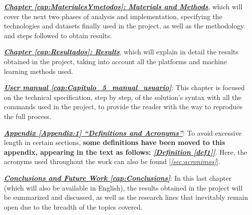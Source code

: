 \hyperref[cap:MaterialesYmetodos]{\textbf{\textit{Chapter \ref*{cap:MaterialesYmetodos}: Materials and Methods}}}, which will cover the next two phases of analysis and implementation, specifying the technologies and datasets finally used in the project, as well as the methodology and steps followed to obtain results.

\hyperref[cap:Resultados]{\textbf{\textit{Chapter \ref*{cap:Resultados}: Results}}}, which will explain in detail the results obtained in the project, taking into account all the platforms and machine learning methods used.

\hyperref[cap:Capitulo_5_manual_usuario]{\textbf{\textit{User manual \ref*{cap:Capitulo_5_manual_usuario}}}}: This chapter is focused on the technical specification, step by step, of the solution's syntax with all the commands used in the project, to provide the reader with the way to reproduce the full process.

\hyperref[Appendix:1]{\textbf{\textit{Appendix \ref*{Appendix:1} ``Definitions and Acronyms''}}}: To avoid excessive length in certain sections, \textbf{some definitions have been moved to this appendix, appearing in the text as follows: \hyperref[def1]{\textit{[Definition \ref*{def1}]}}}. Here, the acronyms used throughout the work can also be found [\textit{\ref{sec:acronimos}}].

\hyperref[cap:Conclusions]{\textbf{\textit{Conclusions and Future Work \ref*{cap:Conclusions}}}}: In this last chapter (which will also be available in English), the results obtained in the project will be summarized and discussed, as well as the research lines that inevitably remain open due to the breadth of the topics covered.